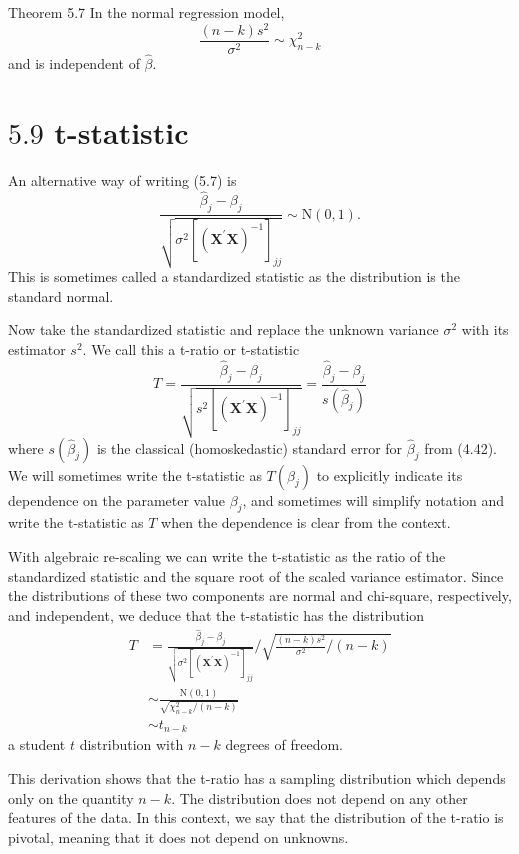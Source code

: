 \documentclass[10pt]{article}
\begin{document}
Theorem 5.7 In the normal regression model,
$$
\frac{(n-k) s^{2}}{\sigma^{2}} \sim \chi_{n-k}^{2}
$$
and is independent of $\widehat{\beta}$.

\section{$5.9$ t-statistic}
An alternative way of writing (5.7) is
$$
\frac{\widehat{\beta}_{j}-\beta_{j}}{\sqrt{\sigma^{2}\left[\left(\boldsymbol{X}^{\prime} \boldsymbol{X}\right)^{-1}\right]_{j j}}} \sim \mathrm{N}(0,1) .
$$
This is sometimes called a standardized statistic as the distribution is the standard normal.

Now take the standardized statistic and replace the unknown variance $\sigma^{2}$ with its estimator $s^{2}$. We call this a t-ratio or t-statistic
$$
T=\frac{\widehat{\beta}_{j}-\beta_{j}}{\sqrt{s^{2}\left[\left(\boldsymbol{X}^{\prime} \boldsymbol{X}\right)^{-1}\right]_{j j}}}=\frac{\widehat{\beta}_{j}-\beta_{j}}{s\left(\widehat{\beta}_{j}\right)}
$$
where $s\left(\widehat{\beta}_{j}\right)$ is the classical (homoskedastic) standard error for $\widehat{\beta}_{j}$ from (4.42). We will sometimes write the t-statistic as $T\left(\beta_{j}\right)$ to explicitly indicate its dependence on the parameter value $\beta_{j}$, and sometimes will simplify notation and write the $\mathrm{t}$-statistic as $T$ when the dependence is clear from the context.

With algebraic re-scaling we can write the t-statistic as the ratio of the standardized statistic and the square root of the scaled variance estimator. Since the distributions of these two components are normal and chi-square, respectively, and independent, we deduce that the t-statistic has the distribution
$$
\begin{aligned}
T &=\frac{\widehat{\beta}_{j}-\beta_{j}}{\sqrt{\sigma^{2}\left[\left(\boldsymbol{X}^{\prime} \boldsymbol{X}\right)^{-1}\right]_{j j}}} / \sqrt{\frac{(n-k) s^{2}}{\sigma^{2}} /(n-k)} \\
& \sim \frac{\mathrm{N}(0,1)}{\sqrt{\chi_{n-k}^{2} /(n-k)}} \\
& \sim t_{n-k}
\end{aligned}
$$
a student $t$ distribution with $n-k$ degrees of freedom.

This derivation shows that the t-ratio has a sampling distribution which depends only on the quantity $n-k$. The distribution does not depend on any other features of the data. In this context, we say that the distribution of the t-ratio is pivotal, meaning that it does not depend on unknowns.
\end{document}
